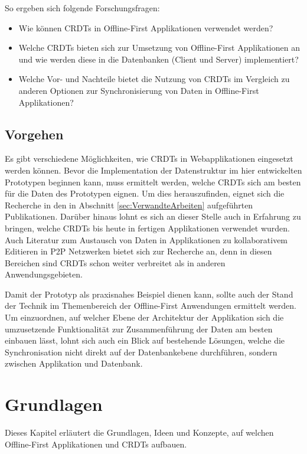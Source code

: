 \documentclass[a4paper, 12pt]{scrreprt}
\begin{document}
So ergeben sich folgende Forschungsfragen:

\begin{itemize}
	\item Wie können \acp{CRDT} in Offline-First Applikationen verwendet werden?
	\item Welche \acp{CRDT} bieten sich zur Umsetzung von Offline-First Applikationen an und wie werden diese in die Datenbanken (Client und Server) implementiert?
	\item Welche Vor- und Nachteile bietet die Nutzung von \acp{CRDT} im Vergleich zu anderen Optionen zur Synchronisierung von Daten in Offline-First Applikationen?
\end{itemize}

\section{Vorgehen}
Es gibt verschiedene Möglichkeiten, wie \acp{CRDT} in Webapplikationen eingesetzt werden können. Bevor die Implementation der Datenstruktur im hier entwickelten Prototypen beginnen kann, muss ermittelt werden, welche \acp{CRDT} sich am besten für die Daten des Prototypen eignen. Um dies herauszufinden, eignet sich die Recherche in den in Abschnitt \ref{sec:VerwandteArbeiten} aufgeführten Publikationen. Darüber hinaus lohnt es sich an dieser Stelle auch in Erfahrung zu bringen, welche \acp{CRDT} bis heute in fertigen Applikationen verwendet wurden. Auch Literatur zum Austausch von Daten in Applikationen zu kollaborativem Editieren in \ac{P2P} Netzwerken bietet sich zur Recherche an, denn in diesen Bereichen sind \acp{CRDT} schon weiter verbreitet als in anderen Anwendungsgebieten.

Damit der Prototyp als praxisnahes Beispiel dienen kann, sollte auch der Stand der Technik im Themenbereich der Offline-First Anwendungen ermittelt werden. Um einzuordnen, auf welcher Ebene der Architektur der Applikation sich die umzusetzende Funktionalität zur Zusammenführung der Daten am besten einbauen lässt, lohnt sich auch ein Blick auf bestehende Lösungen, welche die Synchronisation nicht direkt auf der Datenbankebene durchführen, sondern zwischen Applikation und Datenbank.

\chapter{Grundlagen}
Dieses Kapitel erläutert die Grundlagen, Ideen und Konzepte, auf welchen Offline-First Applikationen und \acp{CRDT} aufbauen. 
\end{document}

